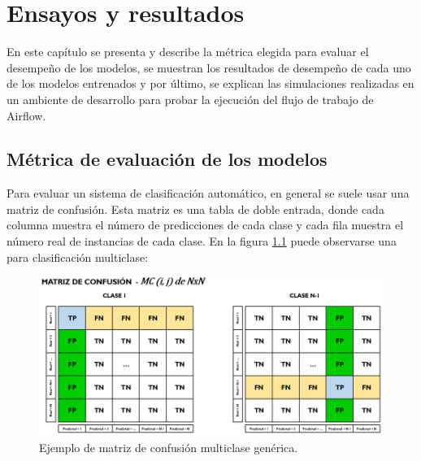 
\chapter{Ensayos y resultados} %

\label{Chapter4} %

En este capítulo se presenta y describe la métrica elegida para evaluar el desempeño de los modelos, se muestran los resultados de desempeño de cada uno de los modelos entrenados y por último, se explican las simulaciones realizadas en un ambiente de desarrollo para probar la ejecución del flujo de trabajo de Airflow.

\section{Métrica de evaluación de los modelos}

Para evaluar un sistema de clasificación automático, en general se suele usar una matriz de confusión. Esta matriz es una tabla de doble entrada, donde cada columna muestra el número de predicciones de cada clase y cada fila muestra el número real de instancias de cada clase. En la figura \ref{fig:matriz-confusion} puede observarse una para clasificación multiclase:

\begin{figure}[htbp]
	\centering
	\includegraphics[width=1\textwidth]{./Figures/matriz-confusion.png}
	\caption{Ejemplo de matriz de confusión multiclase genérica\protect\footnotemark.}
	\label{fig:matriz-confusion}
\end{figure}


